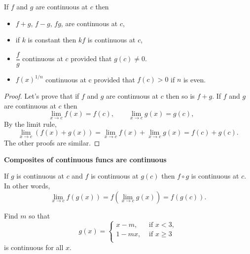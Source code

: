 \documentclass[../main.tex]{subfiles}
\begin{document}
\begin{theorem}
    If $f$ and $g$ are continuous at $c$ then
    \begin{itemize}
        \item $f + g$, $f - g$, $f g$, are continuous at $c$,
        \item if $k$ is constant then $k f$ is continuous at $c$,
        \item $\dfrac{f}{g}$ continuous at $c$ provided that $g(c) \neq 0$.
        \item $f(x)^{1/n}$ continuous at c provided that $f(c)>0$ if $n$ is even.
    \end{itemize}
\end{theorem}

\begin{proof}
    Let's prove that if $f$ and $g$ are continuous at $c$ then so is $f+g$. If $f$ and $g$ are continuous at $c$ then
    \[
        \lim_{x \to c} f(x) = f(c), \qquad
        \lim_{x \to c} g(x) = g(c), \qquad
    \]
    By the limit rule,
    \[
        \lim_{x \to c} (f(x) + g(x)) =
        \lim_{x \to c} f(x) + \lim_{x \to c} g(x) =
        f(c) + g(c).
    \]
    The other proofs are similar.
\end{proof}
\textbf{Composites of continuous funcs are continuous}

If $g$ is continuous at $c$ and $f$ is continuous at $g(c)$ then $f \circ g$ is continuous at $c$. In other words,
\[
    \lim_{x \to c} f(g(x)) = f(\lim_{x \to c} g(x)) = f(g(c)).
\]

\begin{example}
    Find $m$ so that
    \[
        g(x) = \begin{cases}
            x-m, &\text{ if }x < 3,\\
            1-mx, &\text{ if }x \geq 3\\
        \end{cases}
    \]
    is continuous for all $x$.
\end{example}


\end{document}
